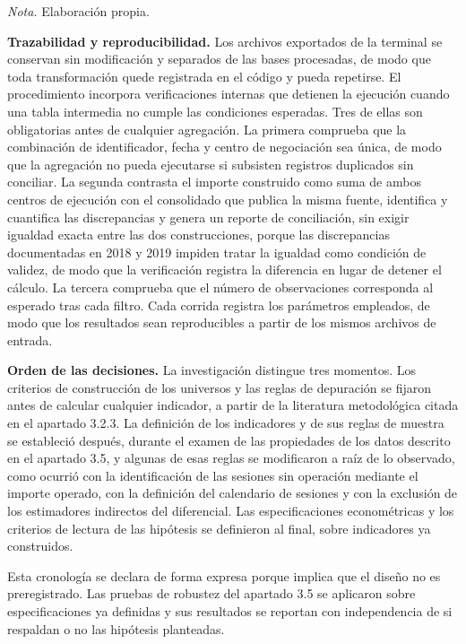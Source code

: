 \emph{Nota.} Elaboración propia.

\textbf{Trazabilidad y reproducibilidad.} Los archivos exportados de la terminal se conservan sin modificación y separados de las bases procesadas, de modo que toda transformación quede registrada en el código y pueda repetirse. El procedimiento incorpora verificaciones internas que detienen la ejecución cuando una tabla intermedia no cumple las condiciones esperadas. Tres de ellas son obligatorias antes de cualquier agregación. La primera comprueba que la combinación de identificador, fecha y centro de negociación sea única, de modo que la agregación no pueda ejecutarse si subsisten registros duplicados sin conciliar. La segunda contrasta el importe construido como suma de ambos centros de ejecución con el consolidado que publica la misma fuente, identifica y cuantifica las discrepancias y genera un reporte de conciliación, sin exigir igualdad exacta entre las dos construcciones, porque las discrepancias documentadas en 2018 y 2019 impiden tratar la igualdad como condición de validez, de modo que la verificación registra la diferencia en lugar de detener el cálculo. La tercera comprueba que el número de observaciones corresponda al esperado tras cada filtro. Cada corrida registra los parámetros empleados, de modo que los resultados sean reproducibles a partir de los mismos archivos de entrada.

\textbf{Orden de las decisiones.} La investigación distingue tres momentos. Los criterios de construcción de los universos y las reglas de depuración se fijaron antes de calcular cualquier indicador, a partir de la literatura metodológica citada en el apartado 3.2.3. La definición de los indicadores y de sus reglas de muestra se estableció después, durante el examen de las propiedades de los datos descrito en el apartado 3.5, y algunas de esas reglas se modificaron a raíz de lo observado, como ocurrió con la identificación de las sesiones sin operación mediante el importe operado, con la definición del calendario de sesiones y con la exclusión de los estimadores indirectos del diferencial. Las especificaciones econométricas y los criterios de lectura de las hipótesis se definieron al final, sobre indicadores ya construidos.

Esta cronología se declara de forma expresa porque implica que el diseño no es preregistrado. Las pruebas de robustez del apartado 3.5 se aplicaron sobre especificaciones ya definidas y sus resultados se reportan con independencia de si respaldan o no las hipótesis planteadas.
